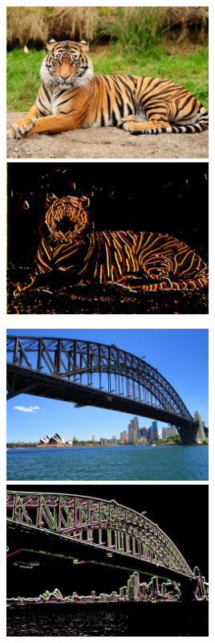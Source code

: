 \documentclass{article}
\begin{document}
\begin{figure}[h!]
\centering
\includegraphics[height=5cm]{images/orig_2.jpg}
\hspace{0.4cm}
\includegraphics[height=5cm]{images/edge_color_2.jpg}
\end{figure}

\begin{figure}[h!]
\centering
\includegraphics[height=5cm]{images/orig_3.jpg}
\hspace{0.4cm}
\includegraphics[height=5cm]{images/edge_color_3.jpg}
\end{figure}
\end{document}
